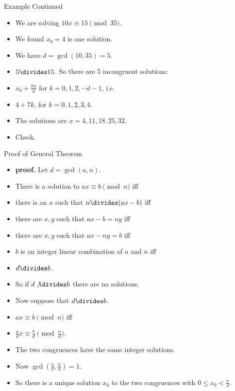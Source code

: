 \documentclass{beamer}
\begin{document}
\begin{frame}{Example Continued}
\begin{itemize}
  \item We are solving $10x \equiv 15 \pmod {35}$.
  \item We found $x_0=4$ is one solution.
  \item We have $d=\gcd(10,35) = 5$.
  \item $5\divides 15$. So there are 5 incongruent solutions:
  \item $x_0 + \frac{kn}{d}$ for $k=0,1,2,\cdots d-1$, i.e.
  \item $4 + 7k$, for $k=0,1,2,3,4$.
  \item The solutions are $x=4,11,18,25,32$.
  \item Check.
\end{itemize}
\end{frame}

\begin{frame}{Proof of General Theorem}
\begin{itemize}
  \item \textbf{proof.} Let $d=\gcd(a,n)$.
  \item There is a solution to $ax\equiv b \pmod n$ iff
  \item there is an $x$ such that $n\divides (ax - b)$ iff
  \item there are $x,y$ such that $ax-b = ny$ iff
  \item there are $x,y$ such that $ax - ny = b$ iff
  \item $b$ is an integer linear combination of $a$ and $n$ iff
  \item $d\divides b$.
  \item So if $d\not\divides b$ there are no solutions.
  \item Now suppose that $d\divides b$.
  \item $ax\equiv b \pmod n$ iff
  \item $\frac{a}{d}x \equiv \frac{b}{d} \pmod {\frac{n}{d}}$.
  \item The two congruences have the same integer solutions.
  \item Now $\gcd(\frac{a}{d},\frac{n}{d}) = 1$.
  \item So there is a unique solution $x_0$ to the two congruences with
  $0\leq x_0 < \frac{n}{d}$.
\end{itemize}
\end{frame}
\end{document}
